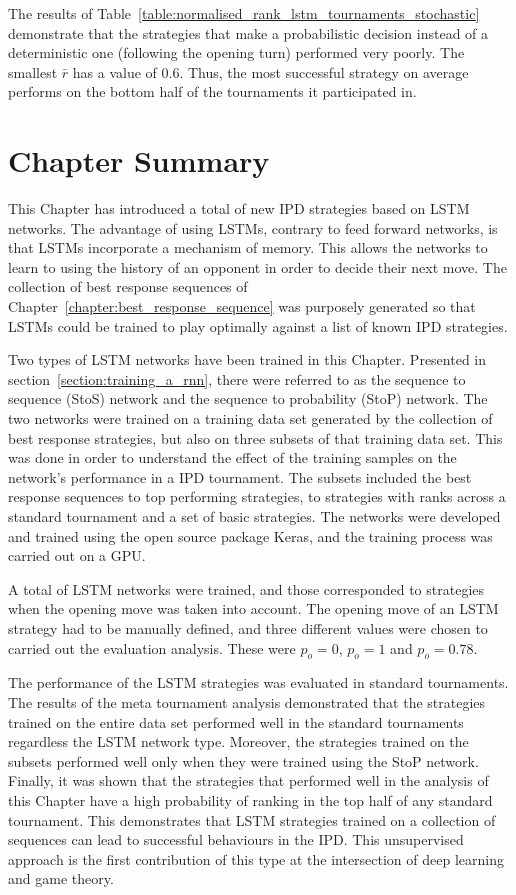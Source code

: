 The results of Table~\ref{table:normalised_rank_lstm_tournaments_stochastic}
demonstrate that the strategies that make a probabilistic decision instead of a
deterministic one (following the opening turn) performed very poorly. The
smallest \(\bar{r}\) has a value of 0.6. Thus, the most successful strategy on
average performs on the bottom half of the tournaments it participated in.

\section{Chapter Summary}

This Chapter has introduced a total of \lstmstrategies new IPD strategies based
on LSTM networks. The advantage of using LSTMs, contrary to feed forward networks,
is that LSTMs incorporate a mechanism of memory. This allows the networks
to learn to using the history of an opponent in order to decide their next move.
The collection of best response sequences of
Chapter~\ref{chapter:best_response_sequence} was purposely generated so that
LSTMs could be trained to play optimally against a list of known IPD strategies.

Two types of LSTM networks have been trained in this Chapter. Presented in
section~\ref{section:training_a_rnn}, there were referred to as the sequence to
sequence (StoS) network and the sequence to probability (StoP) network. The two
networks were trained on a training data set generated by the collection of best
response strategies, but also on three subsets of that training data set. This
was done in order to understand the effect of the training samples on the
network's performance in a IPD tournament. The subsets included the best
response sequences to top performing strategies, to strategies with ranks across
a standard tournament and a set of basic strategies. The networks were developed
and trained using the open source package Keras, and the training process was
carried out on a GPU.

A total of \lstmnetworks LSTM networks were trained, and those corresponded to
\lstmstrategies strategies when the opening move was taken into account. The
opening move of an LSTM strategy had to be manually defined, and three different
values were chosen to carried out the evaluation analysis. These were \(p_o=0\),
\(p_o=1\) and \(p_o=0.78\).

The performance of the \lstmstrategies LSTM strategies was evaluated in
\metatournamentslstm standard tournaments. The results of the meta tournament
analysis demonstrated that the strategies trained on the entire data set
performed well in the \metatournamentslstm standard tournaments regardless the
LSTM network type. Moreover, the strategies trained on the subsets
performed well only when they were trained using the StoP network. Finally, it
was shown that the strategies that performed well in the analysis of this
Chapter have a high probability of ranking in the top half of any standard
tournament. This demonstrates that LSTM strategies trained on a collection of
sequences can lead to successful behaviours in the IPD. This unsupervised approach is the 
first contribution of this 
type at the intersection of deep learning and game theory.

